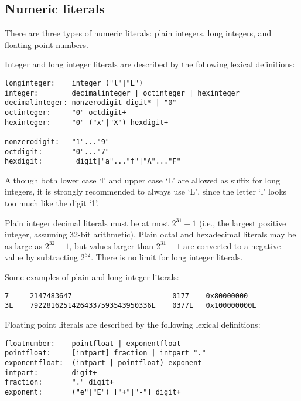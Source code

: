 \subsection{Numeric literals}

There are three types of numeric literals: plain integers, long
integers, and floating point numbers.

Integer and long integer literals are described by the following
lexical definitions:

\begin{verbatim}
longinteger:    integer ("l"|"L")
integer:        decimalinteger | octinteger | hexinteger
decimalinteger: nonzerodigit digit* | "0"
octinteger:     "0" octdigit+
hexinteger:     "0" ("x"|"X") hexdigit+

nonzerodigit:   "1"..."9"
octdigit:       "0"..."7"
hexdigit:        digit|"a"..."f"|"A"..."F"
\end{verbatim}

Although both lower case `l' and upper case `L' are allowed as suffix
for long integers, it is strongly recommended to always use `L', since
the letter `l' looks too much like the digit `1'.

Plain integer decimal literals must be at most $2^{31} - 1$ (i.e., the
largest positive integer, assuming 32-bit arithmetic).  Plain octal and
hexadecimal literals may be as large as $2^{32} - 1$, but values
larger than $2^{31} - 1$ are converted to a negative value by
subtracting $2^{32}$.  There is no limit for long integer literals.

Some examples of plain and long integer literals:

\begin{verbatim}
7     2147483647                        0177    0x80000000
3L    79228162514264337593543950336L    0377L   0x100000000L
\end{verbatim}

Floating point literals are described by the following lexical
definitions:

\begin{verbatim}
floatnumber:    pointfloat | exponentfloat
pointfloat:     [intpart] fraction | intpart "."
exponentfloat:  (intpart | pointfloat) exponent
intpart:        digit+
fraction:       "." digit+
exponent:       ("e"|"E") ["+"|"-"] digit+
\end{verbatim}

